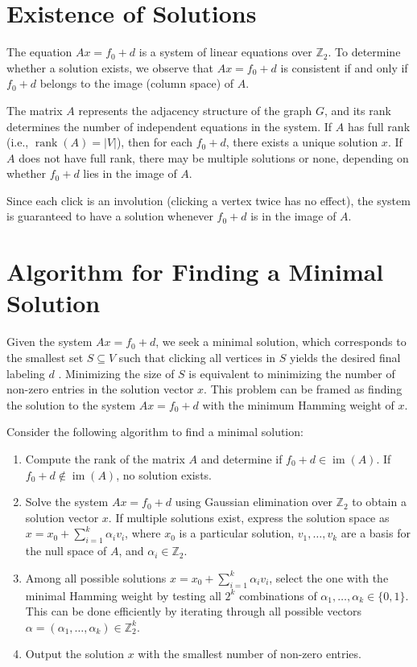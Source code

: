 \documentclass{article}
\begin{document}
\section{Existence of Solutions}

The equation \( A x = f_0 + d \) is a system of linear equations over \( \mathbb{Z}_2 \). To determine whether a solution exists, we observe that \( A x = f_0 + d \) is consistent if and only if \( f_0 + d \) belongs to the image (column space) of \( A \). 

The matrix \( A \) represents the adjacency structure of the graph \( G \), and its rank determines the number of independent equations in the system. If \( A \) has full rank (i.e., \( \operatorname{rank}(A) = |V| \)), then for each \( f_0 + d \), there exists a unique solution \( x \). If \( A \) does not have full rank, there may be multiple solutions or none, depending on whether \( f_0 + d \) lies in the image of \( A \).

Since each click is an involution (clicking a vertex twice has no effect), the system is guaranteed to have a solution whenever \( f_0 + d \) is in the image of \( A \).

\section{Algorithm for Finding a Minimal Solution}

Given the system  \( A x = f_0 + d \), we seek a minimal solution, which corresponds to the smallest set  \( S \subseteq V \) such that clicking all vertices in \( S \) yields the desired final labeling \( d \) . Minimizing the size of \( S \) is equivalent to minimizing the number of non-zero entries in the solution vector \( x \). This problem can be framed as finding the solution to the system \( A x = f_0 + d \)  with the minimum Hamming weight of \( x \).

Consider the following algorithm to find a minimal solution:

\begin{enumerate}
\item Compute the rank of the matrix \( A \)  and determine if \( f_0 + d \in \operatorname{im}(A) \). If \( f_0 + d \notin \operatorname{im}(A) \), no solution exists.
\item Solve the system \( A x = f_0 + d \)  using Gaussian elimination over \(  \mathbb{Z}_2 \) to obtain a solution vector \( x \). If multiple solutions exist, express the solution space as \( x = x_0 + \sum_{i=1}^{k} \alpha_i v_i \), where \( x_0 \) is a particular solution, \( v_1, \dots, v_k \) are a basis for the null space of \( A \), and \( \alpha_i \in \mathbb{Z}_2 \).
\item Among all possible solutions \( x = x_0 + \sum_{i=1}^{k} \alpha_i v_i \), select the one with the minimal Hamming weight by testing all  \( 2^k \)  combinations of \( \alpha_1, \dots, \alpha_k \in \{0, 1\} \). This can be done efficiently by iterating through all possible vectors \( \alpha = (\alpha_1, \dots, \alpha_k) \in \mathbb{Z}_2^k \).
\item Output the solution \( x \)  with the smallest number of non-zero entries.
\end{enumerate}
\end{document}
